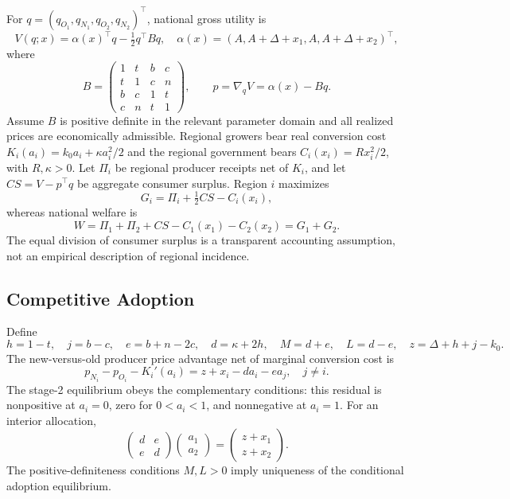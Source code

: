 \documentclass[USenglish]{article}
\begin{document}
For $q=(q_{O_1},q_{N_1},q_{O_2},q_{N_2})^\top$, national gross utility is
\begin{equation}
 V(q;x)=\alpha(x)^\top q-\tfrac12q^\top Bq,\quad
 \alpha(x)=(A,A+\Delta+x_1,A,A+\Delta+x_2)^\top,
 \label{eq:utility}
\end{equation}
where
\begin{equation}
 B=\begin{pmatrix}
 1&t&b&c\\ t&1&c&n\\ b&c&1&t\\ c&n&t&1
 \end{pmatrix},\qquad p=\nabla_q V=\alpha(x)-Bq.
 \label{eq:demand}
\end{equation}
Assume $B$ is positive definite in the relevant parameter domain and all realized prices are economically admissible. Regional growers bear real conversion cost $K_i(a_i)=k_0a_i+\kappa a_i^2/2$ and the regional government bears $C_i(x_i)=Rx_i^2/2$, with $R,\kappa>0$. Let $\Pi_i$ be regional producer receipts net of $K_i$, and let $CS=V-p^\top q$ be aggregate consumer surplus. Region $i$ maximizes
\begin{equation}
 G_i=\Pi_i+\tfrac12 CS-C_i(x_i),
 \label{eq:local}
\end{equation}
whereas national welfare is
\begin{equation}
 W=\Pi_1+\Pi_2+CS-C_1(x_1)-C_2(x_2)=G_1+G_2.
 \label{eq:welfare}
\end{equation}
The equal division of consumer surplus is a transparent accounting assumption, not an empirical description of regional incidence.

\subsection{Competitive Adoption}
Define
\begin{equation}
 h=1-t,\quad j=b-c,\quad e=b+n-2c,\quad
 d=\kappa+2h,\quad M=d+e,\quad L=d-e,\quad
 z=\Delta+h+j-k_0.
 \label{eq:notation}
\end{equation}
The new-versus-old producer price advantage net of marginal conversion cost is
\begin{equation}
 p_{N_i}-p_{O_i}-K_i'(a_i)=z+x_i-d a_i-e a_j,\quad j\ne i.
 \label{eq:adoptionfoc}
\end{equation}
The stage-2 equilibrium obeys the complementary conditions: this residual is nonpositive at $a_i=0$, zero for $0<a_i<1$, and nonnegative at $a_i=1$. For an interior allocation,
\begin{equation}
 \begin{pmatrix}d&e\\e&d\end{pmatrix}
 \begin{pmatrix}a_1\\a_2\end{pmatrix}
 =\begin{pmatrix}z+x_1\\z+x_2\end{pmatrix}.
 \label{eq:adoptionmatrix}
\end{equation}
The positive-definiteness conditions $M,L>0$ imply uniqueness of the conditional adoption equilibrium.
\end{document}
